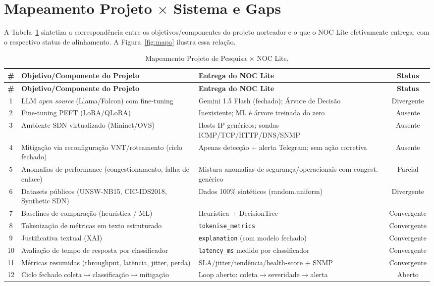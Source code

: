 \documentclass[12pt,a4paper]{article}
\begin{document}
\section{Mapeamento Projeto $\times$ Sistema e Gaps}
\label{sec:mapeamento}

A Tabela~\ref{tab:mapa} sintetiza a correspondência entre os objetivos/componentes
do projeto norteador \cite{rRODRIGUES} e o que o NOC Lite efetivamente entrega, com
o respectivo status de alinhamento. A Figura~\ref{fig:mapa} ilustra essa
relação.

\begin{longtable}{cp{5.4cm}p{5.0cm}c}
\caption{Mapeamento Projeto de Pesquisa $\times$ NOC Lite.}
\label{tab:mapa}\\
\toprule
\textbf{\#} & \textbf{Objetivo/Componente do Projeto} & \textbf{Entrega do NOC Lite} & \textbf{Status} \\
\midrule
\endfirsthead
\toprule
\textbf{\#} & \textbf{Objetivo/Componente do Projeto} & \textbf{Entrega do NOC Lite} & \textbf{Status} \\
\midrule
\endhead
1 & LLM \textit{open source} (Llama/Falcon) com fine-tuning & Gemini 1.5 Flash (fechado); Árvore de Decisão & Divergente \\
2 & Fine-tuning PEFT (LoRA/QLoRA) & Inexistente; ML é árvore treinada do zero & Ausente \\
3 & Ambiente SDN virtualizado (Mininet/OVS) & Hosts IP genéricos; sondas ICMP/TCP/HTTP/DNS/SNMP & Ausente \\
4 & Mitigação via reconfiguração VNT/roteamento (ciclo fechado) & Apenas detecção + alerta Telegram; sem ação corretiva & Ausente \\
5 & Anomalias de performance (congestionamento, falha de enlace) & Mistura anomalias de segurança/operacionais com congest. genérico & Parcial \\
6 & Datasets públicos (UNSW-NB15, CIC-IDS2018, Synthetic SDN) & Dados 100\% sintéticos (random.uniform) & Divergente \\
7 & Baselines de comparação (heurística / ML) & Heurística + DecisionTree & Convergente \\
8 & Tokenização de métricas em texto estruturado & \texttt{tokenise\_metrics} & Convergente \\
9 & Justificativa textual (XAI) & \texttt{explanation} (com modelo fechado) & Convergente \\
10 & Avaliação de tempo de resposta por classificador & \texttt{latency\_ms} medido por classificador & Convergente \\
11 & Métricas resumidas (throughput, latência, jitter, perda) & SLA/jitter/tendência/health-score + SNMP & Convergente \\
12 & Ciclo fechado coleta$\rightarrow$classificação$\rightarrow$mitigação & Loop aberto: coleta$\rightarrow$severidade$\rightarrow$alerta & Aberto \\
\bottomrule
\end{longtable}
\end{document}
